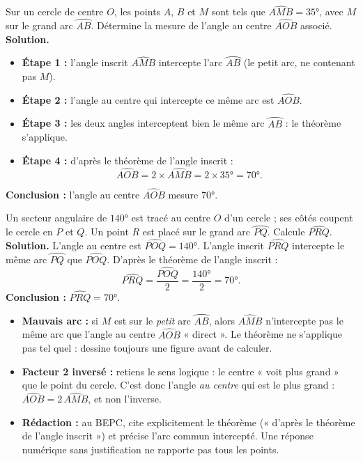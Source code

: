 \documentclass[11pt]{article}
\begin{document}
\begin{exoresolu}
Sur un cercle de centre $O$, les points $A$, $B$ et $M$ sont tels que $\widehat{AMB} = 35°$, avec $M$ sur le grand arc $\wideparen{AB}$. Détermine la mesure de l'angle au centre $\widehat{AOB}$ associé.
\tcblower
\textbf{Solution.}
\begin{itemize}
\item \textbf{Étape 1 :} l'angle inscrit $\widehat{AMB}$ intercepte l'arc $\wideparen{AB}$ (le petit arc, ne contenant pas $M$).
\item \textbf{Étape 2 :} l'angle au centre qui intercepte ce même arc est $\widehat{AOB}$.
\item \textbf{Étape 3 :} les deux angles interceptent bien le même arc $\wideparen{AB}$ : le théorème s'applique.
\item \textbf{Étape 4 :} d'après le théorème de l'angle inscrit :
\[ \widehat{AOB} = 2 \times \widehat{AMB} = 2 \times 35° = 70°. \]
\end{itemize}
\textbf{Conclusion :} l'angle au centre $\widehat{AOB}$ mesure $70°$.
\end{exoresolu}

\begin{exoresolu}
Un secteur angulaire de $140°$ est tracé au centre $O$ d'un cercle ; ses côtés coupent le cercle en $P$ et $Q$. Un point $R$ est placé sur le grand arc $\wideparen{PQ}$. Calcule $\widehat{PRQ}$.
\tcblower
\textbf{Solution.} L'angle au centre est $\widehat{POQ} = 140°$. L'angle inscrit $\widehat{PRQ}$ intercepte le même arc $\wideparen{PQ}$ que $\widehat{POQ}$. D'après le théorème de l'angle inscrit :
\[ \widehat{PRQ} = \frac{\widehat{POQ}}{2} = \frac{140°}{2} = 70°. \]
\textbf{Conclusion :} $\widehat{PRQ} = 70°$.
\end{exoresolu}

\begin{attention}
\begin{itemize}
\item \textbf{Mauvais arc :} si $M$ est sur le \emph{petit} arc $\wideparen{AB}$, alors $\widehat{AMB}$ n'intercepte pas le même arc que l'angle au centre $\widehat{AOB}$ « direct ». Le théorème ne s'applique pas tel quel : dessine toujours une figure avant de calculer.
\item \textbf{Facteur 2 inversé :} retiens le sens logique : le centre « voit plus grand » que le point du cercle. C'est donc l'angle \emph{au centre} qui est le plus grand : $\widehat{AOB} = 2\,\widehat{AMB}$, et non l'inverse.
\item \textbf{Rédaction :} au BEPC, cite explicitement le théorème (« d'après le théorème de l'angle inscrit ») et précise l'arc commun intercepté. Une réponse numérique sans justification ne rapporte pas tous les points.
\end{itemize}
\end{attention}
\end{document}
